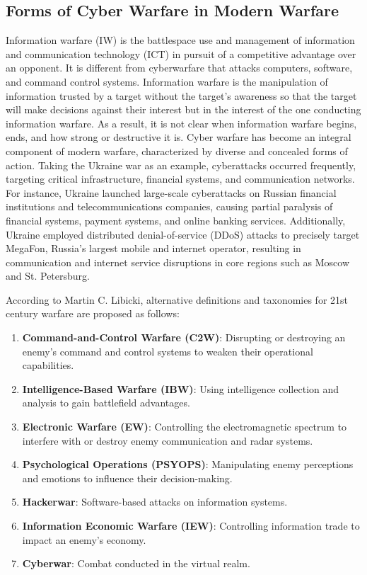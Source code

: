 \documentclass[12pt, a4paper]{article}
\begin{document}
\subsection{Forms of Cyber Warfare in Modern Warfare}
Information warfare (IW) is the battlespace use and management of information and communication technology (ICT) in pursuit of a competitive advantage over an opponent. It is different from cyberwarfare that attacks computers, software, and command control systems. Information warfare is the manipulation of information trusted by a target without the target's awareness so that the target will make decisions against their interest but in the interest of the one conducting information warfare. As a result, it is not clear when information warfare begins, ends, and how strong or destructive it is.\citep{wikipedia_information_warfare}
Cyber warfare has become an integral component of modern warfare, characterized by diverse and concealed forms of action. Taking the Ukraine war as an example, cyberattacks occurred frequently, targeting critical infrastructure, financial systems, and communication networks. For instance, Ukraine launched large-scale cyberattacks on Russian financial institutions and telecommunications companies, causing partial paralysis of financial systems, payment systems, and online banking services. Additionally, Ukraine employed distributed denial-of-service (DDoS) attacks to precisely target MegaFon, Russia's largest mobile and internet operator, resulting in communication and internet service disruptions in core regions such as Moscow and St. Petersburg.

According to Martin C. Libicki, alternative definitions and taxonomies for 21st century warfare are proposed as follows:

\begin{enumerate}
  \item \textbf{Command-and-Control Warfare (C2W)}: Disrupting or destroying an enemy's command and control systems to weaken their operational capabilities.
  \item \textbf{Intelligence-Based Warfare (IBW)}: Using intelligence collection and analysis to gain battlefield advantages.
  \item \textbf{Electronic Warfare (EW)}: Controlling the electromagnetic spectrum to interfere with or destroy enemy communication and radar systems.
  \item \textbf{Psychological Operations (PSYOPS)}: Manipulating enemy perceptions and emotions to influence their decision-making.
  \item \textbf{Hackerwar}: Software-based attacks on information systems.
  \item \textbf{Information Economic Warfare (IEW)}: Controlling information trade to impact an enemy's economy.
  \item \textbf{Cyberwar}: Combat conducted in the virtual realm.
\end{enumerate}
\citep{libicki_what_is}
\end{document}

